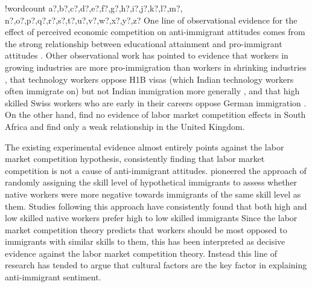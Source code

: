 \documentclass{article}\usepackage[]{graphicx}\usepackage[]{color}
\newcounter{words}
\newenvironment{counted}{%
\setcounter{words}{0}
\SearchList!{wordcount}{\stepcounter{words}}
{a?,b?,c?,d?,e?,f?,g?,h?,i?,j?,k?,l?,m?,
n?,o?,p?,q?,r?,s?,t?,u?,v?,w?,x?,y?,z?}
\UndoBoundary{'}
\SearchOrder{p;}}{%
\StopSearching}
\begin{document}
\begin{counted}
One line of observational evidence for the effect of perceived economic competition on anti-immigrant attitudes comes from the strong relationship between educational attainment and pro-immigrant attitudes \autocite{Scheve2001,Mayda2006}. Other observational work has pointed to evidence that workers in growing industries are more pro-immigration than workers in shrinking industries \autocite{Dancygier2013}, that technology workers oppose H1B visas (which Indian technology workers often immigrate on) but not Indian immigration more generally \autocite{Malhotra2013}, and that high skilled Swiss workers who are early in their careers oppose German immigration \autocite{Helbling2011}. On the other hand, \textcite{Facchini2013} find no evidence of labor market competition effects in South Africa and \textcite{Dustmann2007} find only a weak relationship in the United Kingdom.

The existing experimental evidence almost entirely points against the labor market competition hypothesis, consistently finding that labor market competition is not a cause of anti-immigrant attitudes. \textcite{Hainmueller2010} pioneered the approach of randomly assigning the skill level of hypothetical immigrants to assess whether native workers were more negative towards immigrants of the same skill level as them. Studies following this approach have consistently found that both high and low skilled native workers prefer high to low skilled immigrants \autocite{Hainmueller2007, Hainmueller2010, Bohrer2013, Harell2012, Goldstein2014, Hainmueller2015} Since the labor market competition theory predicts that workers should be most opposed to immigrants with similar skills to them, this has been interpreted as decisive evidence against the labor market competition theory. Instead this line of research has tended to argue that cultural factors are the key factor in explaining anti-immigrant sentiment. 


\end{counted}
\end{document}
